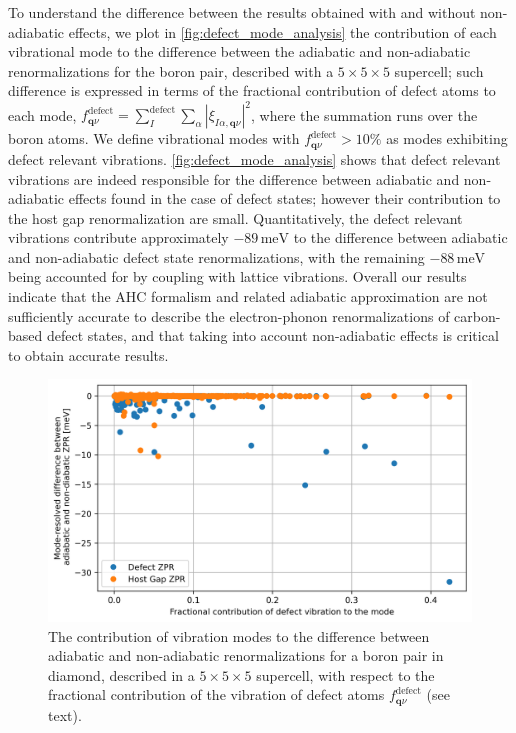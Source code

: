 \documentclass[journal=jctcce,manuscript=article]{achemso}
\newcommand{\bfq}{{\mathbf{q}}}
\begin{document}
To understand the difference between the results obtained with and without non-adiabatic effects, we plot in \autoref{fig:defect_mode_analysis} the contribution of each vibrational mode to the difference between the adiabatic and non-adiabatic renormalizations for the boron pair, described with a  $5\times5\times5$ supercell; such difference is expressed in terms of the fractional contribution of defect atoms to each mode, $f^{\text{defect}}_{\bfq\nu}=\sum_{I}^\mathrm{defect}\sum_{\alpha}|\xi_{I\alpha,\bfq\nu}|^2$, where the summation runs over the boron atoms.
We define vibrational modes with $f_{\bfq\nu}^\mathrm{defect}>10\%$ as modes exhibiting defect relevant vibrations. \autoref{fig:defect_mode_analysis} shows that defect relevant vibrations are indeed responsible for the difference between adiabatic and non-adiabatic effects found in the case of defect states; however their  contribution to the host gap renormalization are small. Quantitatively, the defect relevant vibrations contribute  approximately $-89\,\mathrm{meV}$ to the difference between adiabatic and non-adiabatic defect state renormalizations, with the remaining  $-88\,\mathrm{meV}$ being accounted for by coupling with lattice vibrations. Overall our results indicate that the AHC formalism and related adiabatic approximation are  not sufficiently accurate to describe the electron-phonon renormalizations of carbon-based defect states, and that taking into account non-adiabatic effects is critical to obtain accurate results.

\begin{figure}
    \centering
    \includegraphics[width=\linewidth]{fig/Boron-defect-mode-analysis-5.png}
    \caption{The contribution of vibration modes to the difference between adiabatic and non-adiabatic renormalizations for a boron pair in diamond, described in a $5\times5\times5$ supercell, with respect to the fractional contribution of the vibration of defect atoms $f_{\bfq\nu}^\mathrm{defect}$ (see text).}
    \label{fig:defect_mode_analysis}
\end{figure}
\end{document}
